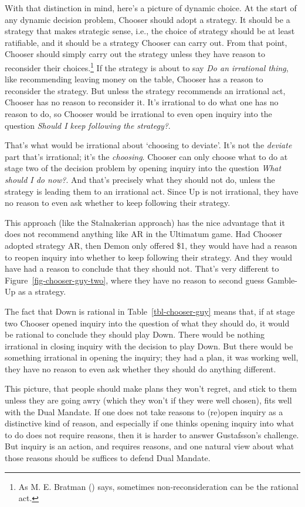 \documentclass[
  10pt,
  letterpaper,
  DIV=11,
  numbers=noendperiod,
  twoside]{scrartcl}
\begin{document}
With that distinction in mind, here's a picture of dynamic choice. At
the start of any dynamic decision problem, Chooser should adopt a
strategy. It should be a strategy that makes strategic sense, i.e., the
choice of strategy should be at least ratifiable, and it should be a
strategy Chooser can carry out. From that point, Chooser should simply
carry out the strategy unless they have reason to reconsider their
choices.\footnote{As M. E. Bratman ()
  says, sometimes non-reconsideration can be the rational act.} If the
strategy is about to say \emph{Do an irrational thing}, like
recommending leaving money on the table, Chooser has a reason to
reconsider the strategy. But unless the strategy recommends an
irrational act, Chooser has no reason to reconsider it. It's irrational
to do what one has no reason to do, so Chooser would be irrational to
even open inquiry into the question \emph{Should I keep following the
strategy?}.

That's what would be irrational about `choosing to deviate'. It's not
the \emph{deviate} part that's irrational; it's the \emph{choosing}.
Chooser can only choose what to do at stage two of the decision problem
by opening inquiry into the question \emph{What should I do now?}. And
that's precisely what they should not do, unless the strategy is leading
them to an irrational act. Since Up is not irrational, they have no
reason to even ask whether to keep following their strategy.

This approach (like the Stalnakerian approach) has the nice advantage
that it does not recommend anything like AR in the Ultimatum game. Had
Chooser adopted strategy AR, then Demon only offered \$1, they would
have had a reason to reopen inquiry into whether to keep following their
strategy. And they would have had a reason to conclude that they should
not. That's very different to Figure~\ref{fig-chooser-guy-two}, where
they have no reason to second guess Gamble-Up as a strategy.

The fact that Down is rational in Table~\ref{tbl-chooser-guy} means
that, if at stage two Chooser opened inquiry into the question of what
they should do, it would be rational to conclude they should play Down.
There would be nothing irrational in closing inquiry with the decision
to play Down. But there would be something irrational in opening the
inquiry; they had a plan, it was working well, they have no reason to
even ask whether they should do anything different.

This picture, that people should make plans they won't regret, and stick
to them unless they are going awry (which they won't if they were well
chosen), fits well with the Dual Mandate. If one does not take reasons
to (re)open inquiry as a distinctive kind of reason, and especially if
one thinks opening inquiry into what to do does not require reasons,
then it is harder to answer Gustafsson's challenge. But inquiry is an
action, and requires reasons, and one natural view about what those
reasons should be suffices to defend Dual Mandate.
\end{document}

